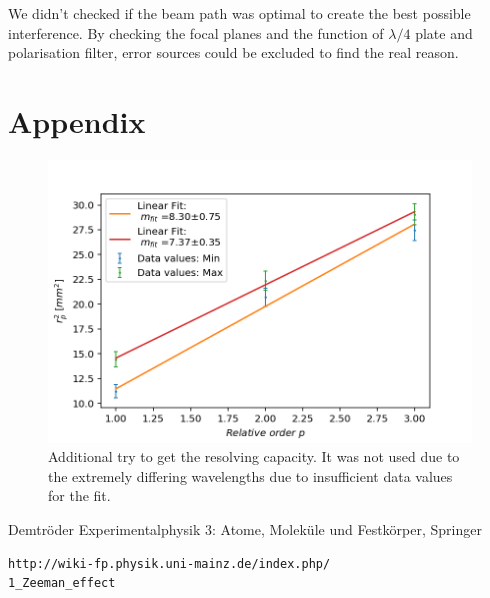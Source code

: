 \documentclass[]{article}
\begin{document}
We didn't checked if the beam path was optimal to create the best possible interference. By checking the focal planes and the function of $\lambda/4$ plate and polarisation filter, error sources could be excluded to find the real reason.


\newpage
\section{Appendix}
\begin{figure}[H]
\centering
\includegraphics[width=1\textwidth]{Plots/Res_Cap.png}
\caption{Additional try to get the resolving capacity. It was not used due to the extremely differing wavelengths due to insufficient data values for the fit.}
\label{fig: not used}
\end{figure}


\newpage
\begin{thebibliography}{}
 Demtröder Experimentalphysik 3: Atome, Moleküle und Festkörper, Springer

 \begin{verbatim}
http://wiki-fp.physik.uni-mainz.de/index.php/
1_Zeeman_effect
\end{verbatim} 


\end{thebibliography}
\end{document}
